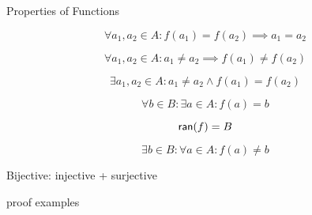 \begin{frame}{}
  \begin{center}
    {\LARGE Properties of Functions}
  \end{center}
\end{frame}

\begin{frame}{}
  \begin{definition}
    \[
      \forall a_1, a_2 \in A: f(a_1) = f(a_2) \implies a_1 = a_2
    \]

    \[
      \forall a_1, a_2 \in A: a_1 \neq a_2 \implies f(a_1) \neq f(a_2)
    \]
  \end{definition}

  \pause
  \[
    \exists a_1, a_2 \in A: a_1 \neq a_2 \land f(a_1) = f(a_2)
  \]
\end{frame}

\begin{frame}{}
  \begin{definition}
    \[
      \forall b \in B: \exists a \in A: f(a) = b
    \]

    \[
      \textsf{ran}(f) = B
    \]
  \end{definition}

  \pause
  \[
    \exists b \in B: \forall a \in A: f(a) \neq b
  \]
\end{frame}

\begin{frame}{}
  \begin{definition}
    \centerline{Bijective: injective + surjective}
  \end{definition}
\end{frame}

\begin{frame}{}
  proof examples
\end{frame}

\begin{frame}{}
\end{frame}

\begin{frame}{}

\end{frame}
